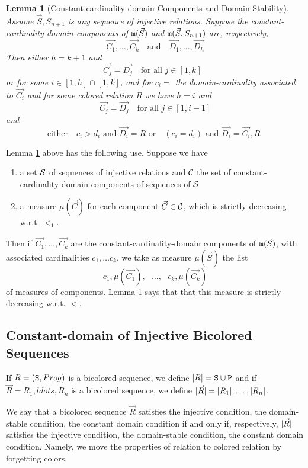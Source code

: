 \documentclass{lmcs}
\newtheorem{lemma}[theorem]{Lemma}
\begin{document}
\begin{lemma}[Constant-cardinality-domain Components and Domain-Stability]
\label{lemma-cardinality-stability}
Assume $\vec{S}, S_{n+1}$ is any sequence of injective relations. Suppose 
the constant-cardinality-domain components of ${\tt m}(\vec{S})$ and 
${\tt m}(\vec{S}, S_{n+1})$ are, respectively, 
$$
\vec{C_1}, \ldots,\vec{C_k} \ \ \ \mbox{ and } \ \ \   \vec{D_1}, \ldots,\vec{D_h}
$$
Then either $h=k+1$ and
$$
\vec{C_j} = \vec{D_j} \ \ \ \mbox{ for all $j \in [1,k]$ }
$$
or for some $i \in [1,h] \cap [1,k]$, and for $c_i = $ the domain-cardinality associated to 
$\vec{C_i}$ and for some colored relation $R$ we have $h=i$ and
$$
\vec{C_j} = \vec{D_j} \ \ \ \mbox{ for all $j \in [1,i-1]$}
$$
and
$$
\mbox{ either } \ \ \ c_i > d_i   \mbox{ and } \vec{D_i} = R
\mbox{ or }      \ \ \ (c_i = d_i) \mbox{ and } \vec{D_i} = \vec{C_i}, R \ \ \ 
$$
\end{lemma}



Lemma \ref{lemma-cardinality-stability} above has the following use. Suppose we have
\begin{enumerate}
\item
a set ${\mathcal S}$ of sequences of injective relations and ${\mathcal C}$ the set of  
constant-cardinality-domain components of sequences of ${\mathcal S}$
\item 
a measure $\mu(\vec{C})$ for each component $\vec{C} \in {\mathcal C}$, which is 
strictly decreasing w.r.t. $<_1$. 
\end{enumerate}

Then if $\vec{C_1}, \ldots,\vec{C_k}$ are the constant-cardinality-domain components of 
${\tt m}(\vec{S})$, with associated cardinalities $c_1, \ldots c_k$,
we take as measure $\mu(\vec{S})$ the list 
$$
c_1,\mu(\vec{C_1}), \ \ \ \ldots, \ \ \ c_k, \mu(\vec{C_k})
$$ 
of measures of components. Lemma \ref{lemma-cardinality-stability} says that that this 
measure is strictly decreasing w.r.t. $<$.


\subsection{Constant-domain of Injective Bicolored Sequences}

If $R= ({\tt S},Prog)$ is a bicolored sequence, we define ${| R |} = {\tt S} \cup {\tt P}$
and if $\vec{R}=R_1, ldots, R_n$ is a bicolored sequence, we define
 ${| \vec{R} |} = {| R_1 |}, \ldots, {| R_n |}$.

We say that  a bicolored sequence $\vec{R}$ satisfies the injective condition, the domain-stable
condition, the constant domain condition if and only if, respectively, ${| \vec{R} |}$
satisfies the injective condition, the domain-stable
condition, the constant domain condition. Namely, we move the properties of relation to 
colored relation by forgetting colors.
\end{document}
